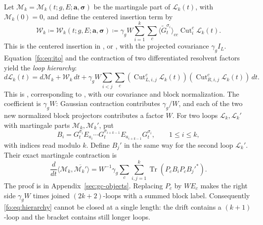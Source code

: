 \documentclass[11pt]{article}
\numberwithin{equation}{section}
\theoremstyle{remark}
\newcommand{\Tr}{\operatorname{Tr}}
\newcommand{\wt}{\widetilde}
\newcommand{\cL}{\mathcal L}
\begin{document}
Let $\mathcal M_k=\mathcal M_k(t;g,E;\boldsymbol a,\boldsymbol\sigma)$
be the martingale part of $\cL_k(t)$, with
\(\mathcal M_k(0)=0\), and define the centered insertion term by
\begin{equation}\label{fo:eq:light}
 \mathcal W_k\coloneqq\mathcal W_k(t;g,E;\boldsymbol a,\boldsymbol\sigma)
 \coloneqq \gamma_g W\sum_{i=1}^k\sum_c
           \langle\wt G_t^{\sigma_i}\rangle_{cc}\operatorname{Cut}_i^c\cL_k(t).
\end{equation}
This is the centered insertion in \cite[(3.26)]{TYY}, or
\cite[(2.47)]{YY}, with the projected covariance $\gamma_g I_L$.
Equation~\eqref{fo:eq:ito} and the contraction of two differentiated
resolvent factors yield the \emph{loop hierarchy}:
\begin{equation}\label{fo:eq:hierarchy}
 d\cL_k(t)=d\mathcal M_k+\mathcal W_k\,dt
  +\gamma_g W\sum_{i<j}\sum_c
       (\operatorname{Cut}_{L,i,j}^c\cL_k(t))
       (\operatorname{Cut}_{R,i,j}^c\cL_k(t))\,dt.
\end{equation}
This is \cite[Lemma~3.6, (3.24)]{TYY}, corresponding to
\cite[Lemma~2.11, (2.45)]{YY}, with our covariance and block
normalization. The coefficient is \(\gamma_g W\): Gaussian contraction
contributes \(\gamma_g/W\), and each of the two new normalized block
projectors contributes a factor \(W\).
For two loops $\cL_k,\cL_k'$ with martingale parts
$\mathcal M_k,\mathcal M_k'$, put
\[
 B_i=G_t^{\sigma_i}E_{a_i}\cdots
 G_t^{\sigma_{i+k-1}}E_{a_{i+k-1}}G_t^{\sigma_i},
 \qquad 1\le i\le k,
\]
with indices read modulo $k$. Define $B_j'$ in the same way for
the second loop $\cL_k'$. Their exact martingale contraction is
\begin{equation}\label{gc:eq:bracket}
 \frac{d}{dt}\langle\mathcal M_k,\overline{\mathcal M_k'}\rangle
 =W^{-1} \gamma_g\sum_c\sum_{i,j=1}^k\Tr(P_cB_iP_cB_j'^*).
\end{equation}
The proof is in Appendix~\ref{sec:gc-objects}. Replacing $P_c$ by
$WE_c$ makes the right side $\gamma_gW$ times joined
$(2k+2)$-loops with a summed block label.
Consequently \eqref{fo:eq:hierarchy} cannot be closed at a single
length: the drift contains a \((k+1)\)-loop and the bracket contains
still longer loops.
\end{document}
